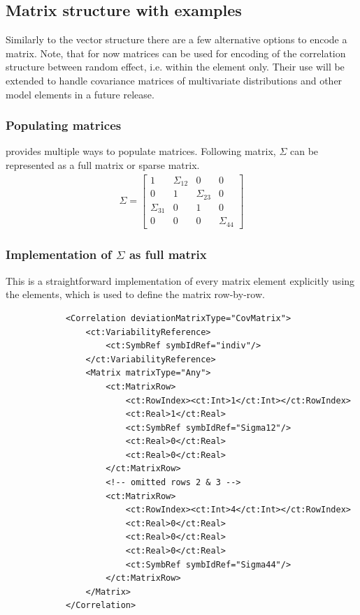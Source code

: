 \subsection{Matrix structure with examples}
\label{subsec:matrixStructure}
Similarly to the vector structure there are a few alternative options to encode a matrix.
Note, that for now matrices can be used for encoding of the correlation structure between
random effect, i.e. within the  element only. Their use will be extended to 
handle covariance matrices of multivariate distributions and other model elements in a future release.

\subsubsection{Populating matrices}
\pharmml provides multiple ways to populate matrices. 
Following matrix, $\Sigma$ can be represented as a full matrix or sparse matrix. 
\label{subsec:matrixType}
\begin{align}
\Sigma = 
  \begin{bmatrix} 
  1 & \Sigma_{12} & 0 & 0 \\
  0 & 1 & \Sigma_{23} & 0 \\
  \Sigma_{31} & 0 & 1 & 0 \\
  0 & 0 & 0 & \Sigma_{44} \nonumber \end{bmatrix} 
\end{align}

\subsubsection{Implementation of $\Sigma$ as full matrix}
This is a straightforward implementation of every matrix element explicitly using
the  elements, which is used to define the matrix row-by-row.  
\lstset{language=XML}
\begin{lstlisting}
            <Correlation deviationMatrixType="CovMatrix">
                <ct:VariabilityReference>
                    <ct:SymbRef symbIdRef="indiv"/>
                </ct:VariabilityReference>
                <Matrix matrixType="Any">
                    <ct:MatrixRow>
                        <ct:RowIndex><ct:Int>1</ct:Int></ct:RowIndex>
                        <ct:Real>1</ct:Real>
                        <ct:SymbRef symbIdRef="Sigma12"/>
                        <ct:Real>0</ct:Real>
                        <ct:Real>0</ct:Real>
                    </ct:MatrixRow>
                    <!-- omitted rows 2 & 3 -->
                    <ct:MatrixRow>
                        <ct:RowIndex><ct:Int>4</ct:Int></ct:RowIndex>
                        <ct:Real>0</ct:Real>
                        <ct:Real>0</ct:Real>
                        <ct:Real>0</ct:Real>
                        <ct:SymbRef symbIdRef="Sigma44"/>
                    </ct:MatrixRow>
                </Matrix>
            </Correlation> 
\end{lstlisting}
 
